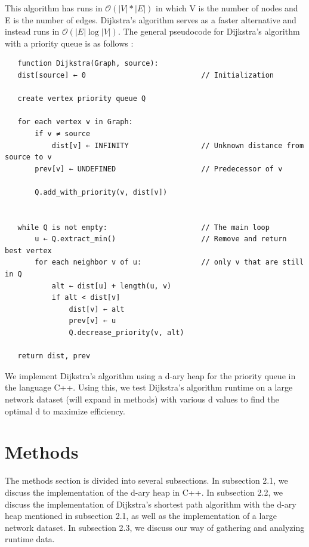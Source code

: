 \documentclass[a4paper,10pt]{article}
\begin{document}
This algorithm has runs in $\mathcal{O}(\lvert V \rvert * \lvert E\rvert)$ in which V is the number of nodes and E is the number of edges. Dijkstra's algorithm serves as a faster alternative and instead runs in $\mathcal{O}(\lvert E\rvert \log{}\lvert V \rvert)$. The general pseudocode for Dijkstra's algorithm with a priority queue is as follows \cite{dijkstra}:
\begin{verbatim}
   function Dijkstra(Graph, source):
   dist[source] ← 0                           // Initialization
 
   create vertex priority queue Q
 
   for each vertex v in Graph:           
       if v ≠ source
           dist[v] ← INFINITY                 // Unknown distance from source to v
       prev[v] ← UNDEFINED                    // Predecessor of v
  
       Q.add_with_priority(v, dist[v])
  
  
   while Q is not empty:                      // The main loop
       u ← Q.extract_min()                    // Remove and return best vertex
       for each neighbor v of u:              // only v that are still in Q
           alt ← dist[u] + length(u, v) 
           if alt < dist[v]
               dist[v] ← alt
               prev[v] ← u
               Q.decrease_priority(v, alt)
  
   return dist, prev
\end{verbatim}

We implement Dijkstra's algorithm using a d-ary heap for the priority queue in the language C++. Using this, we test Dijkstra's algorithm runtime on a large network dataset (will expand in methods) with various d values to find the optimal d to maximize efficiency.
 
 
\section{Methods}
The methods section is divided into several subsections. In subsection 2.1, we discuss the implementation of the d-ary heap in C++. In subsection 2.2, we discuss the implementation of Dijkstra's shortest path algorithm with the d-ary heap mentioned in subsection 2.1, as well as the implementation of a large network dataset. In subsection 2.3, we discuss our way of gathering and analyzing runtime data.
\end{document}
